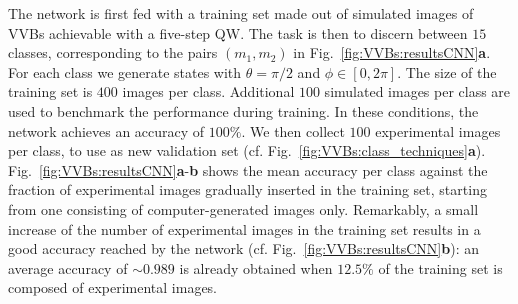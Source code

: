 The network is first fed with a training set made out of simulated images of \acp{VVB} achievable with a five-step \ac{QW}.
The task is then to discern between $15$ classes, corresponding to the pairs $(m_1,m_2)$ in Fig.~\ref{fig:VVBs:resultsCNN}\textbf{a}.
For each class we generate states with $\theta=\pi/2$ and $\phi\in[0,2\pi]$. The size of the training set is $400$ images per class. Additional $100$ simulated images per class are used to benchmark the performance during training. In these conditions, the network achieves an accuracy of $100\%$. 
We then collect $100$ experimental images per class, to use as new validation set (cf. Fig.~\ref{fig:VVBs:class_techniques}{\bf a}). Fig.~\ref{fig:VVBs:resultsCNN}{\bf a}-{\bf b} shows the mean accuracy per class against the fraction of experimental images gradually inserted in the training set, starting from one consisting of computer-generated images only.
Remarkably, a small increase of the number of experimental images in the training set results in a good accuracy reached by the network (cf. Fig.~\ref{fig:VVBs:resultsCNN}{\bf b}): an average accuracy of $\sim 0.989$ is already obtained when $12.5\%$ of the training set is composed of experimental images.


